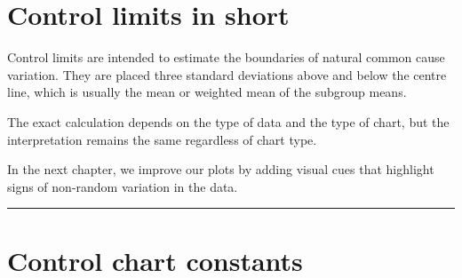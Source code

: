 \documentclass[
]{book}
\begin{document}
\section{Control limits in short}\label{control-limits-in-short}

Control limits are intended to estimate the boundaries of natural common
cause variation. They are placed three standard deviations above and
below the centre line, which is usually the mean or weighted mean of the
subgroup means.

The exact calculation depends on the type of data and the type of chart,
but the interpretation remains the same regardless of chart type.

In the next chapter, we improve our plots by adding visual cues that
highlight signs of non-random variation in the data.

\begin{center}\rule{0.5\linewidth}{0.5pt}\end{center}

\section*{Control chart constants}\label{chart-constants}
\end{document}
